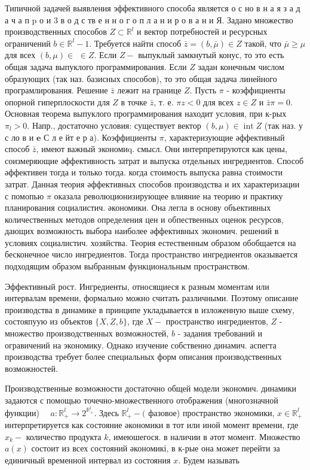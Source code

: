 \documentclass[10pt]{article}
\begin{document}
Типичной задачей выявления эффективного способа является о с но в н а я з а д а ч а п $\mathrm{p}$ о и 3 в о д с тв е н н о г о п л а н и р о в а н и Я. Задано множество производственных способов $Z \subset \mathbb{R}^{l}$ и вектор потребностей и ресурсных ограничений $b \in \mathbb{R}^{l}-1$. Требуется найти способ $\bar{z}=(b, \bar{\mu}) \in Z$ такой, что $\bar{\mu} \geqslant \mu$ для всех $(b, \mu) \in$ $\in Z$. Если $Z-$ выпуклый замкнутый конус, то это есть общая задача выпуклого программирования. Если $Z$ задан конечным числом образующих (так наз. базисных способов), то это общая задача линейного програмлирования. Решение $\bar{z}$ лежит на границе $Z$. Пусть $\pi$ - коэффициенты опорной гиперплоскости для $Z$ в точке $\bar{z}$, т. е. $\pi z<0$ для всех $z \in Z$ и $\bar{z} \pi=0$. Основная теорема выпуклого программирования находит условия, при к-рых $\pi_{l}>0$. Напр., достаточно условия: существует вектор $(b, \mu) \in \operatorname{int} Z$ (так наз. у с ло в и $\mathbf{e}$ С л е йт е р а). Коэффициенты $\pi$, характеризующие әффективный способ $\bar{z}$, имеют важный экономиq. смысл. Они интерпретируются как цены, соизмеряющие әффективность затрат и выпуска отдельных ингредиентов. Способ әффективен тогда и только тогда. когда стоимость выпуска равна стоимости затрат. Данная теория әффективных способов производства и их характеризации с помопью $\pi$ оказала революционизирующее влияние на теорию и практику планирования социалистич. әкономики. Она легла в основу объективных количественных методов определения цен и обпественных оценок ресурсов, дающих возможность выбора наиболее әффективных экономич. решений в условиях социалистич. хозяйства. Теория естественным образом обобщается на бесконечное число ингредиентов. Тогда пространство ингредиентов оказывается подходящим образом выбранным функциональным пространством.



Эффективный рост. Ингредиенты, относящиеся к разным моментам или интервалам времени, формально можно считать различными. Поэтому описание производства в динамике в принципе укладывается в изложенную выше схему, состояпуую из объектов $\{X, Z, b\}$, где $X-$ пространство ингредиентов, $Z$ - множество производственных возможностей, $b$ - задания требований и огравичений на экономику. Однако изучение собственно динамич. аспегта производства требует более специальных форм описания производственных возможностей.



Производственные возможности достаточно общей модели экономич. динамики задаются с помощью точечно-множественного отображения (многозначной функции) $\quad a: \mathbb{R}_{+}^{l} \rightarrow 2^{\mathbb{R}_{+}^{l}}$. Здесь $\mathbb{R}_{+}^{l}-($ фазовое) пространство экономики, $x \in \mathbb{R}_{+}^{l}$ интерпретируется как состояние әкономики в тот или иной момент времени, где $x_{k}-$ количество продукта $k$, имеюшегося. в наличии в әтот момент. Множество $a(x)$ состоит из всех состояний әкономикі, в к-рые она может перейти за единичный временной интервал из состояния $x$. Будем называть
\end{document}
